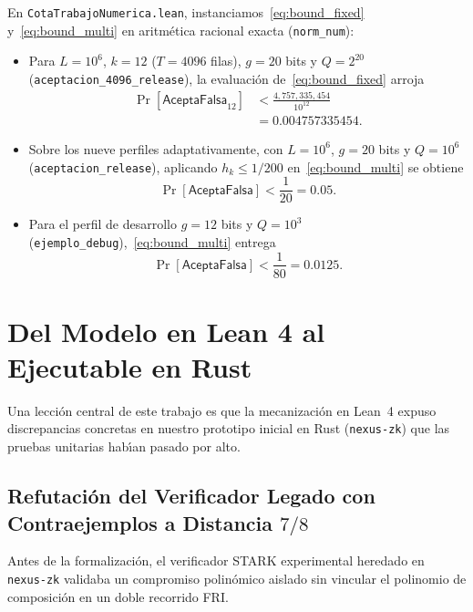 \documentclass[conference]{IEEEtran}
\theoremstyle{definition}
\begin{document}
En \texttt{CotaTrabajoNumerica.lean}, instanciamos~\eqref{eq:bound_fixed} y~\eqref{eq:bound_multi} en aritm\'{e}tica racional exacta (\texttt{norm\_num}):
\begin{itemize}
    \setlength{\itemsep}{2pt}
    \item Para $L = 10^6$, $k = 12$ ($T = 4096$ filas), $g = 20$ bits y $Q = 2^{20}$ (\texttt{aceptacion\_4096\_release}), la evaluaci\'{o}n de~\eqref{eq:bound_fixed} arroja
    \begin{equation}
    \label{eq:num_4096}
    \begin{aligned}
    \Pr[\mathsf{AceptaFalsa}_{12}] &< \frac{4{,}757{,}335{,}454}{10^{12}} \\
    &= 0.004757335454.
    \end{aligned}
    \end{equation}
    \item Sobre los nueve perfiles adaptativamente, con $L = 10^6$, $g = 20$ bits y $Q = 10^6$ (\texttt{aceptacion\_release}), aplicando $h_k \le 1/200$ en~\eqref{eq:bound_multi} se obtiene
    \begin{equation}
    \label{eq:num_release}
    \Pr[\mathsf{AceptaFalsa}] < \frac{1}{20} = 0.05.
    \end{equation}
    \item Para el perfil de desarrollo $g = 12$ bits y $Q = 10^3$ (\texttt{ejemplo\_debug}),~\eqref{eq:bound_multi} entrega
    \begin{equation}
    \label{eq:num_debug}
    \Pr[\mathsf{AceptaFalsa}] < \frac{1}{80} = 0.0125.
    \end{equation}
\end{itemize}

\section{Del Modelo en Lean 4 al Ejecutable en Rust}
\label{sec:rust}

Una lecci\'{o}n central de este trabajo es que la mecanizaci\'{o}n en Lean~4 expuso discrepancias concretas en nuestro prototipo inicial en Rust (\texttt{nexus-zk}) que las pruebas unitarias hab\'{\i}an pasado por alto.

\subsection{Refutaci\'{o}n del Verificador Legado con Contraejemplos a Distancia $7/8$}
Antes de la formalizaci\'{o}n, el verificador STARK experimental heredado en \texttt{nexus-zk} validaba un compromiso polin\'{o}mico aislado sin vincular el polinomio de composici\'{o}n en un doble recorrido FRI.
\end{document}
